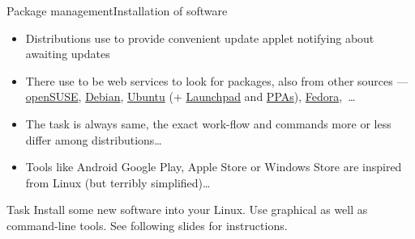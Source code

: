 \documentclass[compress, xelatex, 11pt, xcolor=svgnames, aspectratio=169,
	hyperref={
		bookmarks=true,
		unicode=true,
		colorlinks=true,
		pdftitle={Linux, command line and MetaCentrum},
		plainpages=false,
		pdfauthor={Vojtech Zeisek},
		pdfsubject={Course about use of Linux command line, writing shell scripts and using MetaCentrum of CESNET},
		pdfcreator={XeLaTeX},
		pdfkeywords={Linux, GNU, BASH, shell, command line, MetaCentrum},
		linkcolor=DarkRed, %
		anchorcolor=DarkBlue, %
		citecolor=Indigo, %
		filecolor=NavyBlue, %
		menucolor=DarkMagenta, %
		urlcolor=DarkBlue, %
		},
	url={hyphens, lowtilde} %
	]{beamer}
\begin{document}
\begin{frame}[allowframebreaks]{Package management}{Installation of software}
\begin{itemize}
		\begin{itemize}
			\item Ubuntu Software Center
			\item Synaptic --- feature rich, graphical, advances, for any DEB distribution (Debian, Ubuntu, Mint,~\ldots)
			\item Aptitude --- feature rich, command-line, advanced, for any DEB distribution (more advanced version of Apt)
			\item DPKG --- low-level, any DEB-based distribution
			\item YaST Software for openSUSE (feature rich, graphical as well as command-line)
			\item Zypper --- feature rich, command-line, advanced, for openSUSE
			\item DNF --- feature rich, command-line, advanced, for Fedora and another RPM based distributions (replacing older Yum)
			\item RPM --- low level, any RPM-based distribution
			\item GNOME software --- in most of distributions using GNOME
			\item And many more\ldots
			\item All do same task --- as soon as user master one, others are equally simple
		\end{itemize}
		\item Distributions use to provide convenient update applet notifying about awaiting updates
		\item There use to be web services to look for packages, also from other sources --- \href{https://software.opensuse.org/explore}{openSUSE}, \href{https://www.debian.org/distrib/packages\#search_packages}{Debian}, \href{https://packages.ubuntu.com/}{Ubuntu} (+ \href{https://launchpad.net/ubuntu/+search}{Launchpad} and \href{https://launchpad.net/ubuntu/+ppas}{PPAs}), \href{https://packages.fedoraproject.org/}{Fedora},~\ldots
		\item The task is always same, the exact work-flow and commands more or less differ among distributions\ldots
		\item Tools like Android Google Play, Apple Store or Windows Store are inspired from Linux (but terribly simplified)\ldots
	\end{itemize}
	\vfill
	\begin{block}{Task}
		Install some new software into your Linux. Use graphical as well as command-line tools. See following slides for instructions.
	\end{block}
\end{frame}
\end{document}
